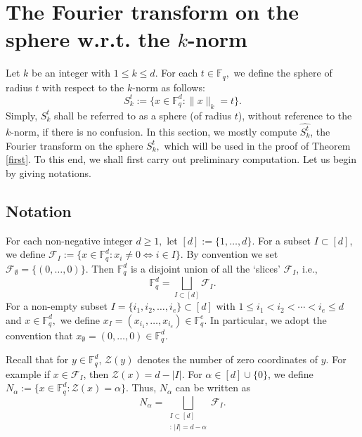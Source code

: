 \documentclass[a4paper,11pt]{amsart}
\numberwithin{equation}{section}
\def\FI{\mathcal{F}_I}
\def\Fq#1{\mathbb{F}_q^{#1}}
\def\knorm#1#2{\lVert#2\rVert_{#1}}
\begin{document}
\section{The Fourier transform on the sphere w.r.t. the $k$-norm} \label{Ch3}
Let $k$ be an integer with $1\le k\le d.$ For each $t\in \mathbb F_q,$  we define the sphere of radius $t$ with respect to the $k$-norm as follows:
\[S_{k}^t := \{x \in \Fq{d} : \knorm{k}{x} = t\}.\]
Simply, $S_{k}^t$ shall be referred to as a sphere (of radius $t$), without reference to the $k$-norm, if there is no confusion.
In this section, we mostly compute $\widehat{S_{k}^t}$, the Fourier transform on the  sphere $S_{k}^t,$ which will be used in the proof of Theorem \ref{first}.
To this end, we shall first carry out preliminary computation. Let us begin by giving notations.

\subsection{Notation}
For each non-negative integer $d\ge 1,$ let $[d] := \{1,\dots, d\}$. For a subset $I \subset [d]$, we define $\mathcal{F}_I := \{x \in \Fq{d} : x_i \neq 0 \iff i \in I\}$. By convention we set $\mathcal{F}_{\emptyset}
 = \{(0,\ldots,0)\}$.  Then $\Fq{d}$ is a disjoint union of all the `slices' $\mathcal{F}_I$, i.e., \begin{equation}\label{Fslice}
     \Fq{d} = \bigsqcup_{I\subset [d]}\mathcal{F}_I.
 \end{equation}
For a non-empty subset $I = \{i_1, i_2, \ldots, i_e\} \subset  [d]$ with $1\le i_1<i_2< \cdots < i_e\le d$ and $x\in \Fq{d},$  we define $x_I=(x_{i_1},\ldots, x_{i_e})\in \mathbb F_q^e$. In particular, we adopt the convention that   $x_{\emptyset}=(0,\ldots, 0)\in \mathbb F_q^d.$

Recall that for $y \in \Fq{d}$, $\mathcal{Z}(y)$ denotes the number of zero coordinates of $y.$ For example
if $x\in \mathcal{F}_I$, then $\mathcal{Z}(x)= d-|I|$. For $\alpha \in [d]\cup \{0\}$, we define $N_\alpha := \{x \in \Fq{d} : \mathcal{Z}(x) = \alpha\}$. 
Thus, $N_\alpha$ can be written as
\begin{equation}\label{Na}
N_\alpha = \bigsqcup_{\substack{{I \subset [d]}\\ {:\, |I| = d- \alpha}}} \FI.
\end{equation}
\end{document}
